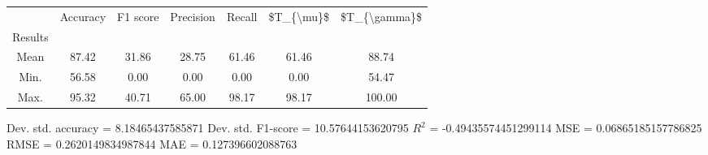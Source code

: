 \begin{tabular}{|c|c|c|c|c|c|c|}
\toprule
{} &  Accuracy &  F1 score &  Precision &  Recall &  \$T\_\{\textbackslash mu\}\$ &  \$T\_\{\textbackslash gamma\}\$ \\
Results &           &           &            &         &            &               \\
\hline
Mean    &     87.42 &     31.86 &      28.75 &   61.46 &      61.46 &         88.74 \\
Min.    &     56.58 &      0.00 &       0.00 &    0.00 &       0.00 &         54.47 \\
Max.    &     95.32 &     40.71 &      65.00 &   98.17 &      98.17 &        100.00 \\
\bottomrule
\end{tabular}

 Dev. std. accuracy = 8.18465437585871
 Dev. std. F1-score = 10.57644153620795
 $R^2$ = -0.49435574451299114
 MSE = 0.06865185157786825
 RMSE = 0.2620149834987844
 MAE = 0.127396602088763